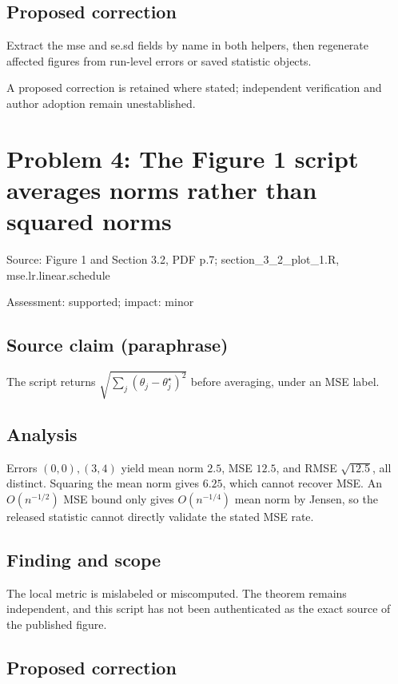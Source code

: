 \documentclass[11pt]{article}
\begin{document}
\subsection*{Proposed correction}

Extract the mse and se.sd fields by name in both helpers, then regenerate affected figures from run-level errors or saved statistic objects.

A proposed correction is retained where stated; independent verification and author adoption remain unestablished.

\section*{Problem 4: The Figure 1 script averages norms rather than squared norms}

Source: Figure 1 and Section 3.2, PDF p.7; section\_3\_2\_plot\_1.R, mse.lr.linear.schedule

Assessment: supported; impact: minor

\subsection*{Source claim (paraphrase)}

The script returns \(\sqrt{\sum_j(\theta_j-\theta_j^\star)^2}\) before averaging, under an MSE label.

\subsection*{Analysis}

Errors \((0,0),(3,4)\) yield mean norm \(2.5\), MSE \(12.5\), and RMSE \(\sqrt{12.5}\), all distinct. Squaring the mean norm gives \(6.25\), which cannot recover MSE. An \(O(n^{-1/2})\) MSE bound only gives \(O(n^{-1/4})\) mean norm by Jensen, so the released statistic cannot directly validate the stated MSE rate.

\subsection*{Finding and scope}

The local metric is mislabeled or miscomputed. The theorem remains independent, and this script has not been authenticated as the exact source of the published figure.

\subsection*{Proposed correction}
\end{document}
